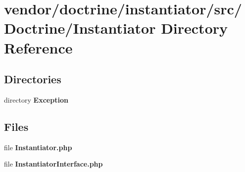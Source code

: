 \section{vendor/doctrine/instantiator/src/\+Doctrine/\+Instantiator Directory Reference}
\label{dir_613b244c96849b726459d68633cd5dbb}
\subsection*{Directories}
\begin{DoxyCompactItemize}
\item 
directory {\bf Exception}
\end{DoxyCompactItemize}
\subsection*{Files}
\begin{DoxyCompactItemize}
\item 
file {\bf Instantiator.\+php}
\item 
file {\bf Instantiator\+Interface.\+php}
\end{DoxyCompactItemize}
